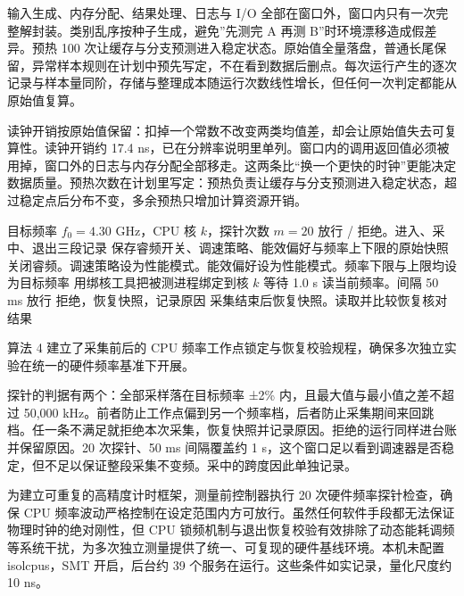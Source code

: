 输入生成、内存分配、结果处理、日志与 I/O 全部在窗口外，窗口内只有一次完整解封装。类别乱序按种子生成，避免”先测完 A 再测 B”时环境漂移造成假差异。预热 100 次让缓存与分支预测进入稳定状态。原始值全量落盘，普通长尾保留，异常样本规则在计划中预先写定，不在看到数据后删点。每次运行产生的逐次记录与样本量同阶，存储与整理成本随运行次数线性增长，但任何一次判定都能从原始值复算。

读钟开销按原始值保留：扣掉一个常数不改变两类均值差，却会让原始值失去可复算性。读钟开销约 17.4 ns，已在分辨率说明里单列。窗口内的调用返回值必须被用掉，窗口外的日志与内存分配全部移走。这两条比“换一个更快的时钟”更能决定数据质量。预热次数在计划里写定：预热负责让缓存与分支预测进入稳定状态，超过稳定点后分布不变，多余预热只增加计算资源开销。

\begin{algorithm}[H]
\caption{锁频控制与恢复核对}
\label{alg:frequency}
\begin{algorithmic}[1]
\Require 目标频率 $f_0=4.30$ GHz，CPU 核 $k$，探针次数 $m=20$
\Ensure 放行 / 拒绝。进入、采中、退出三段记录
\State 保存睿频开关、调速策略、能效偏好与频率上下限的原始快照
\State 关闭睿频。调速策略设为性能模式。能效偏好设为性能模式。频率下限与上限均设为目标频率
\State 用绑核工具把被测进程绑定到核 $k$
\State 等待 1.0 s
  \State 读当前频率。间隔 50 ms
\EndFor
{}
  \State 放行
\Else
  \State 拒绝，恢复快照，记录原因
\EndIf
\State 采集结束后恢复快照。读取并比较恢复核对结果
\end{algorithmic}
\end{algorithm}

算法 4 建立了采集前后的 CPU 频率工作点锁定与恢复校验规程，确保多次独立实验在统一的硬件频率基准下开展。

探针的判据有两个：全部采样落在目标频率 ±2\% 内，且最大值与最小值之差不超过 50,000 kHz。前者防止工作点偏到另一个频率档，后者防止采集期间来回跳档。任一条不满足就拒绝本次采集，恢复快照并记录原因。拒绝的运行同样进台账并保留原因。20 次探针、50 ms 间隔覆盖约 1 s，这个窗口足以看到调速器是否稳定，但不足以保证整段采集不变频。采中的跨度因此单独记录。

为建立可重复的高精度计时框架，测量前控制器执行 20 次硬件频率探针检查，确保 CPU 频率波动严格控制在设定范围内方可放行。虽然任何软件手段都无法保证物理时钟的绝对刚性，但 CPU 锁频机制与退出恢复校验有效排除了动态能耗调频等系统干扰，为多次独立测量提供了统一、可复现的硬件基线环境。本机未配置 isolcpus，SMT 开启，后台约 39 个服务在运行。这些条件如实记录，量化尺度约 10 ns。 %

